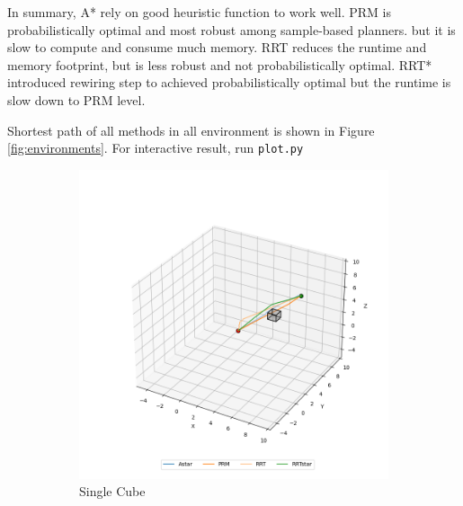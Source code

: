\documentclass[conference]{IEEEtran}
\begin{document}
In summary, 
A* rely on good heuristic function to work well.
PRM is probabilistically optimal and most robust among sample-based planners. 
but it is slow to compute and consume much memory.
RRT reduces the runtime and memory footprint, but is less robust and not probabilistically optimal.
RRT* introduced rewiring step to achieved probabilistically optimal but the runtime is slow down to PRM level.

\appendix
Shortest path of all methods in all environment is shown in Figure \ref{fig:environments}.
For interactive result, run \texttt{plot.py}

\begin{figure}[htbp]
    \centering

    \begin{subfigure}[b]{0.3\textwidth}
        \centering
        \includegraphics[width=\textwidth]{img/single_cube.png}
        \caption{Single Cube}
    \end{subfigure}
    \hfill
    \begin{subfigure}[b]{0.3\textwidth}
        \centering

\end{subfigure}
\end{figure}
\end{document}
